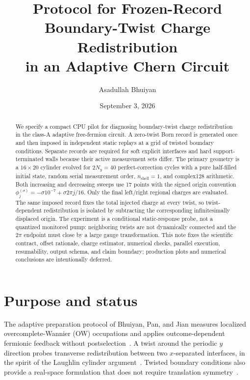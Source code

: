 \documentclass[aps,prb,twocolumn,floatfix,nofootinbib,superscriptaddress]{revtex4-2}
\begin{document}
\title{\texorpdfstring{Protocol for Frozen-Record Boundary-Twist Charge
Redistribution\\in an Adaptive Chern Circuit}{Protocol for Frozen-Record
Boundary-Twist Charge Redistribution in an Adaptive Chern Circuit}}
\author{Asadullah Bhuiyan}
\date{September 3, 2026}

\begin{abstract}
We specify a compact CPU pilot for diagnosing boundary-twist charge
redistribution in the class-A adaptive free-fermion circuit.  A zero-twist
Born record is generated once and then imposed in independent static replays
at a grid of twisted boundary conditions.  Separate records are required for
soft explicit interfaces and hard support-terminated walls because their
active measurement sets differ.  The primary geometry is a
$16\times20$ cylinder evolved for $2N_y=40$ perfect-correction cycles with a
pure half-filled initial state, random serial measurement order,
$n_{\mathrm{shell}}=1$, and complex128 arithmetic.  Both increasing and
decreasing sweeps use 17 points with the signed origin convention
$\phi_j^{(\sigma)}=-\sigma10^{-7}+\sigma2\pi j/16$.  Only the final
left/right regional charges are evaluated.  The same imposed record fixes the
total injected charge at every twist, so twist-dependent redistribution is
isolated by subtracting the corresponding infinitesimally displaced origin.
The experiment is a conditional static-response probe, not a quantized
monitored pump: neighboring twists are not dynamically connected and the
$2\pi$ endpoint must close by a large gauge transformation.  This note fixes
the scientific contract, offset rationale, charge estimator, numerical
checks, parallel execution, resumability, output schema, and claim boundary;
production plots and numerical conclusions are intentionally deferred.
\end{abstract}

\maketitle
\setcounter{tocdepth}{2}
\onecolumngrid
\tableofcontents
\twocolumngrid

\section{Purpose and status}

The adaptive preparation protocol of Bhuiyan, Pan, and Jian measures localized
overcomplete-Wannier (OW) occupations and applies outcome-dependent fermionic
feedback without postselection~\cite{BhuiyanPanJian2026}.  A twist around the
periodic $y$ direction probes transverse redistribution between two
$x$-separated interfaces, in the spirit of the Laughlin cylinder
argument~\cite{Laughlin1981,Halperin1982}.  Twisted boundary conditions also
provide a real-space formulation that does not require translation
symmetry~\cite{NiuThouless1984,NiuThoulessWu1985}.
\end{document}
